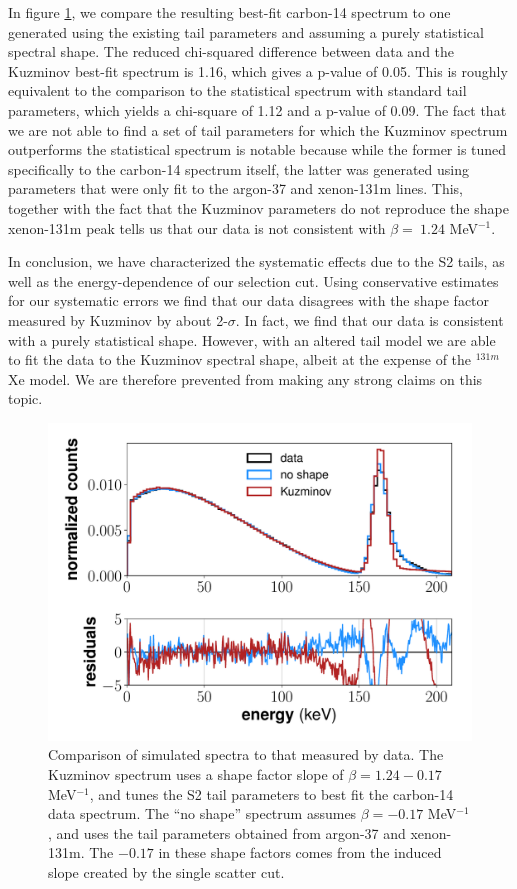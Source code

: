 In figure \ref{fig:C14_shape}, we compare the resulting best-fit carbon-14 spectrum to one generated using the existing tail parameters and assuming a purely statistical spectral shape. The reduced chi-squared difference between data and the Kuzminov best-fit spectrum is 1.16, which gives a p-value of 0.05. This is roughly equivalent to the comparison to the statistical spectrum with standard tail parameters, which yields a chi-square of 1.12 and a p-value of 0.09. The fact that we are not able to find a set of tail parameters for which the Kuzminov spectrum outperforms the statistical spectrum is notable because while the former is tuned specifically to the carbon-14 spectrum itself, the latter was generated using parameters that were only fit to the argon-37 and xenon-131m lines. This, together with the fact that the Kuzminov parameters do not reproduce the shape xenon-131m peak tells us that our data is not consistent with $\beta = \ 1.24$ MeV$^{-1}$.

In conclusion, we have characterized the systematic effects due to the S2 tails, as well as the energy-dependence of our selection cut. Using conservative estimates for our systematic errors we find that our data disagrees with the shape factor measured by Kuzminov by about 2-$\sigma$. In fact, we find that our data is consistent with a purely statistical shape. However, with an altered tail model we are able to fit the data to the Kuzminov spectral shape, albeit at the expense of the $^{131m}$Xe model. We are therefore prevented from making any strong claims on this topic.
\begin{figure}[!h]
\centering
  \includegraphics[width=\textwidth]{Figures/C14_spectrum_shapecomp.pdf}
\caption{Comparison of simulated spectra to that measured by data. The Kuzminov spectrum uses a shape factor slope of $\beta=1.24-0.17$ MeV$^{-1}$, and tunes the S2 tail parameters to best fit the carbon-14 data spectrum. The ``no shape'' spectrum assumes $\beta=-0.17$ MeV$^{-1}$, and uses the tail parameters obtained from argon-37 and xenon-131m. The $-0.17$ in these shape factors comes from the induced slope created by the single scatter cut.}
\label{fig:C14_shape}
\end{figure}



